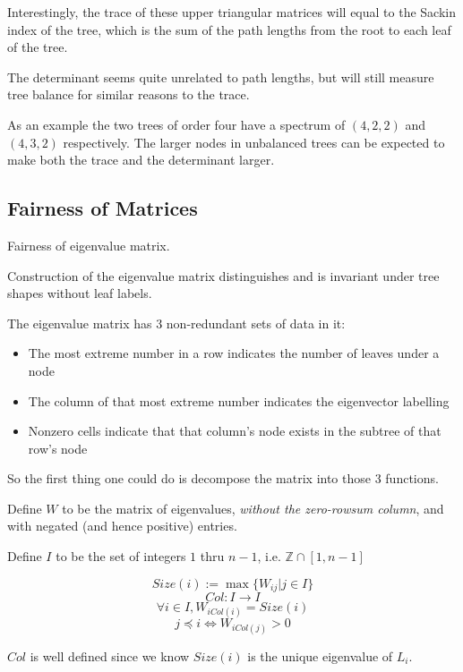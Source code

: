 \documentclass{article}
\begin{document}
Interestingly, the trace of these upper triangular matrices will equal to the Sackin index of the tree, which is the sum of the path lengths from the root to each leaf of the tree.

The determinant seems quite unrelated to path lengths, but will still measure tree balance for similar reasons to the trace.

As an example the two trees of order four have a spectrum of $(4, 2, 2)$ and $(4, 3, 2)$ respectively.
The larger nodes in unbalanced trees can be expected to make both the trace and the determinant larger.

\subsection{Fairness of Matrices}

\begin{theorem} Fairness of eigenvalue matrix.

	Construction of the eigenvalue matrix distinguishes and is invariant under tree shapes without leaf labels.
\end{theorem}

The eigenvalue matrix has 3 non-redundant sets of data in it:
\begin{itemize}
	\item The most extreme number in a row indicates the number of leaves under
		a node
	\item The column of that most extreme number indicates the eigenvector
		labelling
	\item Nonzero cells indicate that that column's node exists in the subtree
		of that row's node
\end{itemize}

So the first thing one could do is decompose the matrix into those 3 functions.

Define $W$ to be the matrix of eigenvalues, \emph{without the zero-rowsum
column}, and with negated (and hence positive) entries.

Define $I$ to be the set of integers $1$ thru $n-1$, i.e. $\mathds{Z} \cap [1,
n-1]$

\[\mathit{Size}(i) := \max\{W_{ij} | j \in I\}\]
\[\mathit{Col}: I \rightarrow I\]
\[\forall i \in I, W_{i \mathit{Col}(i)} = \mathit{Size}(i)\]
\[j \preccurlyeq i \Leftrightarrow W_{i \mathit{Col}(j)} > 0\]

$\mathit{Col}$ is well defined since we know $\mathit{Size}(i)$ is the unique
eigenvalue of $L_i$.
\end{document}
